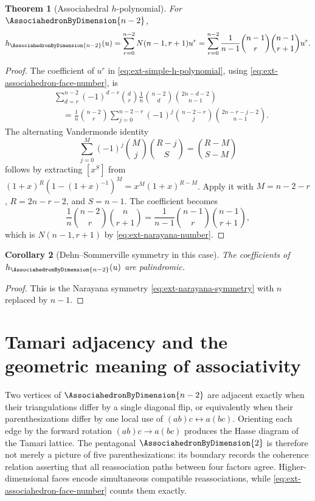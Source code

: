 \documentclass[11pt,a4paper,oneside,openany]{book}
\newtheorem{theorem}{Theorem}[chapter]
\newtheorem{corollary}[theorem]{Corollary}
\theoremstyle{definition}
\theoremstyle{remark}
\begin{document}
\begin{theorem}[Associahedral \(h\)-polynomial]
\label{thm:ext-associahedron-h}
For \(\AssociahedronByDimension{n-2}\),
\begin{equation}\label{eq:ext-associahedron-h}
 h_{\AssociahedronByDimension{n-2}}(u)=\sum_{r=0}^{n-2}N(n-1,r+1)u^r
 =\sum_{r=0}^{n-2}\frac1{n-1}
   \binom{n-1}{r}\binom{n-1}{r+1}u^r.
\end{equation}
\end{theorem}
\begin{proof}
The coefficient of \(u^r\) in
\eqref{eq:ext-simple-h-polynomial}, using
\eqref{eq:ext-associahedron-face-number}, is
\begin{align*}
 &\sum_{d=r}^{n-2}(-1)^{d-r}\binom dr
 \frac1n\binom{n-2}{d}\binom{2n-d-2}{n-1}\\
 &\quad=\frac1n\binom{n-2}{r}
 \sum_{j=0}^{n-2-r}(-1)^j\binom{n-2-r}{j}
 \binom{2n-r-j-2}{n-1}.
\end{align*}
The alternating Vandermonde identity
\begin{equation}\label{eq:ext-alternating-vandermonde}
 \sum_{j=0}^M(-1)^j\binom Mj\binom{R-j}{S}
 =\binom{R-M}{S-M}
\end{equation}
follows by extracting \([x^S]\) from
\((1+x)^R(1-(1+x)^{-1})^M=x^M(1+x)^{R-M}\).  Apply it with
\(M=n-2-r\), \(R=2n-r-2\), and \(S=n-1\).  The coefficient becomes
\[
 \frac1n\binom{n-2}{r}\binom n{r+1}
 =\frac1{n-1}\binom{n-1}{r}\binom{n-1}{r+1},
\]
which is \(N(n-1,r+1)\) by
\eqref{eq:ext-narayana-number}.
\end{proof}

\begin{corollary}[Dehn--Sommerville symmetry in this case]
The coefficients of \(h_{\AssociahedronByDimension{n-2}}(u)\) are palindromic.
\end{corollary}
\begin{proof}
This is the Narayana symmetry \eqref{eq:ext-narayana-symmetry} with
\(n\) replaced by \(n-1\).
\end{proof}

\section{Tamari adjacency and the geometric meaning of associativity}

Two vertices of \(\AssociahedronByDimension{n-2}\) are adjacent exactly when their triangulations differ by
a single diagonal flip, or equivalently when their parenthesizations differ by
one local use of \((ab)c\leftrightarrow a(bc)\).  Orienting each edge by the
forward rotation \((ab)c\to a(bc)\) produces the Hasse diagram of the Tamari
lattice.  The pentagonal \(\AssociahedronByDimension{2}\) is therefore not merely a picture of five
parenthesizations: its boundary records the coherence relation asserting that
all reassociation paths between four factors agree.  Higher-dimensional faces
encode simultaneous compatible reassociations, while
\eqref{eq:ext-associahedron-face-number} counts them exactly.
\end{document}
